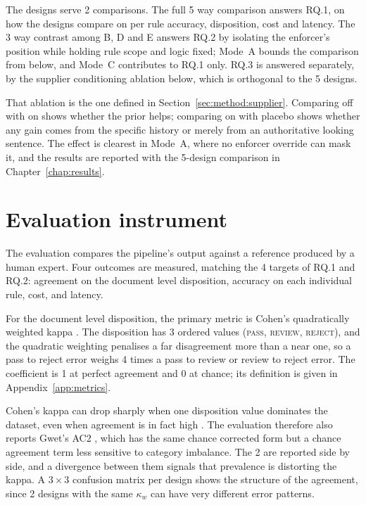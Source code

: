 The designs serve 2 comparisons. The full 5 way comparison answers RQ.1, on how the designs compare on per rule accuracy, disposition, cost and latency. The 3 way contrast among B, D and E answers RQ.2 by isolating the enforcer's position while holding rule scope and logic fixed; Mode~A bounds the comparison from below, and Mode~C contributes to RQ.1 only. RQ.3 is answered separately, by the supplier conditioning ablation below, which is orthogonal to the 5 designs.

That ablation is the one defined in Section~\ref{sec:method:supplier}. Comparing off with on shows whether the prior helps; comparing on with placebo shows whether any gain comes from the specific history or merely from an authoritative looking sentence. The effect is clearest in Mode~A, where no enforcer override can mask it, and the results are reported with the 5-design comparison in Chapter~\ref{chap:results}.


\section{Evaluation instrument}
\label{sec:method:eval}

The evaluation compares the pipeline's output against a reference produced by a human expert. Four outcomes are measured, matching the 4 targets of RQ.1 and RQ.2: agreement on the document level disposition, accuracy on each individual rule, cost, and latency.

For the document level disposition, the primary metric is Cohen's quadratically weighted kappa \citep{cohen1968kappa}. The disposition has 3 ordered values (\textsc{pass}, \textsc{review}, \textsc{reject}), and the quadratic weighting penalises a far disagreement more than a near one, so a pass to reject error weighs 4 times a pass to review or review to reject error. The coefficient is 1 at perfect agreement and 0 at chance; its definition is given in Appendix~\ref{app:metrics}.

Cohen's kappa can drop sharply when one disposition value dominates the dataset, even when agreement is in fact high \citep{cicchetti1990}. The evaluation therefore also reports Gwet's AC2 \citep{gwet2008}, which has the same chance corrected form but a chance agreement term less sensitive to category imbalance. The 2 are reported side by side, and a divergence between them signals that prevalence is distorting the kappa. A $3 \times 3$ confusion matrix per design shows the structure of the agreement, since 2 designs with the same $\kappa_w$ can have very different error patterns.

